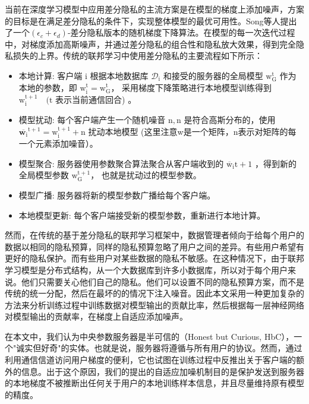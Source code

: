 当前在深度学习模型中应用差分隐私的主流方案是在模型的梯度上添加噪声，方案的目标是在满足差分隐私的条件下，实现整体模型的最优可用性。Song等人提出了一个$\left(\epsilon_{c}+\epsilon_{d}\right)$-差分隐私版本的随机梯度下降算法。在模型的每一次迭代过程中，对梯度添加高斯噪声，并通过差分隐私的组合性和隐私放大效果，得到完全隐私损失的上界。传统的联邦学习中使用差分隐私的主要流程如下所示：
\begin{itemize}
\item 本地计算:
客户端 $\mathrm{i}$ 根据本地数据库 $\mathcal{D}_{\mathrm{i}}$ 和接受的服务器的全局模型 $\mathrm{w}_{\mathrm{G}}^{\mathrm{t}}$ 作为本地的参数，即 $\mathrm{w}_{\mathrm{i}}^{\mathrm{t}}=\mathrm{w}_{\mathrm{G}}^{\mathrm{t}}$， 采用梯度下降策略进行本地模型训练得到 $\mathrm{w}_{\mathrm{i}}^{\mathrm{t}+1} \quad(\mathrm{t}$ 表示当前通信回合) 。

\item 模型扰动:
每个客户端产生一个随机噪音 $\mathrm{n},\mathrm{n}$ 是符合高斯分布的，使用 $\overline{\mathbf{w}_{\mathrm{i}}}^{\mathrm{t}+1}=\mathrm{w}_{\mathrm{i}}^{\mathrm{t}+1}+\mathrm{n}$ 扰动本地模型 (这里注意w是一个矩阵，n表示对矩阵的每一个元素添加噪音）。

\item 模型聚合:
服务器使用参数聚合算法聚合从客户端收到的 $\overline{\mathrm{w}}_{\mathrm{i}} \mathrm{t}+1$ ，得到新的全局模型参数 $\mathrm{w}_{\mathrm{G}}^{\mathrm{t}+1}$， 也就是扰动过的模型参数。

\item 模型广播:
服务器将新的模型参数广播给每个客户端。

\item 本地模型更新:
每个客户端接受新的模型参数，重新进行本地计算。
\end{itemize}

然而，在传统的基于差分隐私的联邦学习框架中，数据管理者倾向于给每个用户的数据以相同的隐私预算，同样的隐私预算忽略了用户之间的差异。有些用户希望有更好的隐私保护。而有些用户对某些数据的隐私不敏感。在这种情况下，由于联邦学习模型是分布式结构，从一个大数据库到许多小数据库，所以对于每个用户来说。他们只需要关心他们自己的隐私。他们可以设置不同的隐私预算方案，而不是传统的统一分配，然后在最坏的的情况下注入噪音。因此本文采用一种更加复杂的方法来分析训练过程中训练数据对模型输出的贡献比率，然后根据每一层神经网络对模型输出的贡献率，在梯度上自适应添加噪声。

在本文中，我们认为中央参数服务器是半可信的（Honest but Curious, HbC），一个"诚实但好奇"的实体。也就是说，服务器将遵循与所有用户的协议。然而，通过利用通信信道访问用户梯度的便利，它也试图在训练过程中反推出关于客户端的额外的信息。出于这个原因，我们的提出的自适应加噪机制目的是保护发送到服务器的本地梯度不被推断出任何关于用户的本地训练样本信息，并且尽量维持原有模型的精度。

